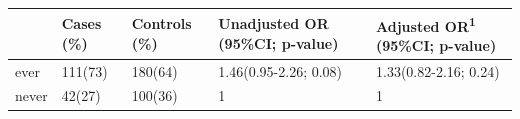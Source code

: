 \documentclass[
]{article}
\begin{document}
\begin{longtable}[]{@{}lllll@{}}
\toprule
\begin{minipage}[b]{0.06\columnwidth}\raggedright
\strut
\end{minipage} & \begin{minipage}[b]{0.10\columnwidth}\raggedright
Cases (\%)\strut
\end{minipage} & \begin{minipage}[b]{0.12\columnwidth}\raggedright
Controls (\%)\strut
\end{minipage} & \begin{minipage}[b]{0.29\columnwidth}\raggedright
Unadjusted OR (95\%CI; p-value)\strut
\end{minipage} & \begin{minipage}[b]{0.28\columnwidth}\raggedright
Adjusted OR\textsuperscript{1} (95\%CI; p-value)\strut
\end{minipage}\tabularnewline
\midrule
\endhead
\begin{minipage}[t]{0.06\columnwidth}\raggedright
ever\strut
\end{minipage} & \begin{minipage}[t]{0.10\columnwidth}\raggedright
111(73)\strut
\end{minipage} & \begin{minipage}[t]{0.12\columnwidth}\raggedright
180(64)\strut
\end{minipage} & \begin{minipage}[t]{0.29\columnwidth}\raggedright
1.46(0.95-2.26; 0.08)\strut
\end{minipage} & \begin{minipage}[t]{0.28\columnwidth}\raggedright
1.33(0.82-2.16; 0.24)\strut
\end{minipage}\tabularnewline
\begin{minipage}[t]{0.06\columnwidth}\raggedright
never\strut
\end{minipage} & \begin{minipage}[t]{0.10\columnwidth}\raggedright
42(27)\strut
\end{minipage} & \begin{minipage}[t]{0.12\columnwidth}\raggedright
100(36)\strut
\end{minipage} & \begin{minipage}[t]{0.29\columnwidth}\raggedright
1\strut
\end{minipage} & \begin{minipage}[t]{0.28\columnwidth}\raggedright
1\strut
\end{minipage}\tabularnewline
\bottomrule
\end{longtable}
\end{document}
